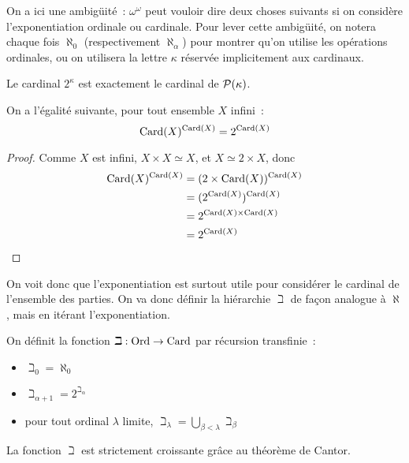 \begin{notation}
  On a ici une ambigüité~: $\omega^\omega$ peut vouloir dire deux choses
  suivants si on considère l'exponentiation ordinale ou cardinale. Pour lever
  cette ambigüité, on notera chaque fois $\aleph_0$ (respectivement
  $\aleph_\alpha$) pour montrer qu'on utilise les opérations ordinales, ou on
  utilisera la lettre $\kappa$ réservée implicitement aux cardinaux.
\end{notation}

\begin{remark}
  Le cardinal $2^\kappa$ est exactement le cardinal de $\mathcal{P}(\kappa)$.
\end{remark}

\begin{proposition}
  On a l'égalité suivante, pour tout ensemble $X$ infini~:
  \[\operatorname{Card}(X)^{\operatorname{Card}(X)} = 2^{\operatorname{Card}(X)}\]
\end{proposition}

\begin{proof}
  Comme $X$ est infini, $X\times X \simeq X$, et $X \simeq 2\times X$, donc
  \begin{align*}
    \operatorname{Card}(X)^{\operatorname{Card}(X)} &= (2\times\operatorname{Card}(X))^{\operatorname{Card}(X)}\\
    &= (2^{\operatorname{Card}(X)})^{\operatorname{Card}(X)} \\
    &= 2^{\operatorname{Card}(X)\times\operatorname{Card}(X)} \\
    &= 2^{\operatorname{Card}(X)}
  \end{align*}
\end{proof}

On voit donc que l'exponentiation est surtout utile pour considérer le cardinal
de l'ensemble des parties. On va donc définir la hiérarchie $\beth$ de façon
analogue à $\aleph$, mais en itérant l'exponentiation.

\begin{definition}
  On définit la fonction $\beth : \operatorname{Ord} \to \operatorname{Card}$ par récursion transfinie~:
  \begin{itemize}
  \item $\beth_0 = \aleph_0$
  \item $\beth_{\alpha + 1} = 2^{\beth_\alpha}$
  \item pour tout ordinal $\lambda$ limite,
    $\displaystyle\beth_\lambda = \bigcup_{\beta < \lambda} \beth_\beta$
  \end{itemize}
\end{definition}

La fonction $\beth$ est strictement croissante grâce au théorème de Cantor.

